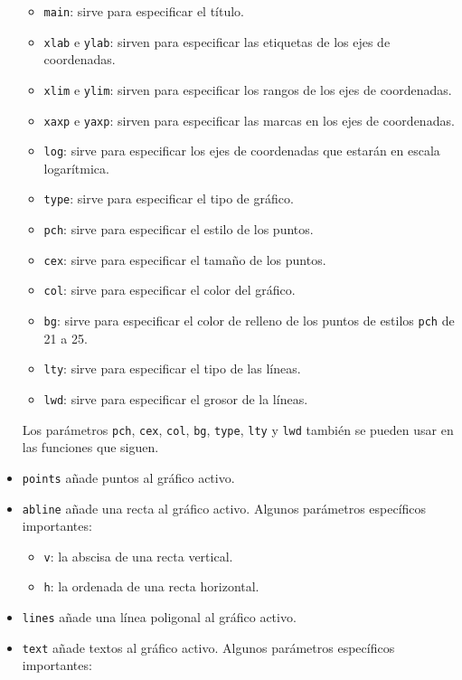 \documentclass[]{book}
\providecommand{\tightlist}{%
  \setlength{\itemsep}{0pt}\setlength{\parskip}{0pt}}
\theoremstyle{definition}
\theoremstyle{definition}
\theoremstyle{definition}
\theoremstyle{remark}
\begin{document}
\begin{itemize}
  \begin{itemize}
  \tightlist
  \item
    \texttt{main}: sirve para especificar el título.
  \item
    \texttt{xlab} e \texttt{ylab}: sirven para especificar las etiquetas de los ejes de coordenadas.
  \item
    \texttt{xlim} e \texttt{ylim}: sirven para especificar los rangos de los ejes de coordenadas.
  \item
    \texttt{xaxp} e \texttt{yaxp}: sirven para especificar las marcas en los ejes de coordenadas.
  \item
    \texttt{log}: sirve para especificar los ejes de coordenadas que estarán en escala logarítmica.
  \item
    \texttt{type}: sirve para especificar el tipo de gráfico.
  \item
    \texttt{pch}: sirve para especificar el estilo de los puntos.
  \item
    \texttt{cex}: sirve para especificar el tamaño de los puntos.
  \item
    \texttt{col}: sirve para especificar el color del gráfico.
  \item
    \texttt{bg}: sirve para especificar el color de relleno de los puntos de estilos \texttt{pch} de 21 a 25.
  \item
    \texttt{lty}: sirve para especificar el tipo de las líneas.
  \item
    \texttt{lwd}: sirve para especificar el grosor de la líneas.
  \end{itemize}

  Los parámetros \texttt{pch}, \texttt{cex}, \texttt{col}, \texttt{bg}, \texttt{type}, \texttt{lty} y \texttt{lwd} también se pueden usar en las funciones que siguen.
\item
  \texttt{points} añade puntos al gráfico activo.
\item
  \texttt{abline} añade una recta al gráfico activo. Algunos parámetros específicos importantes:

  \begin{itemize}
  \tightlist
  \item
    \texttt{v}: la abscisa de una recta vertical.
  \item
    \texttt{h}: la ordenada de una recta horizontal.
  \end{itemize}
\item
  \texttt{lines} añade una línea poligonal al gráfico activo.
\item
  \texttt{text} añade textos al gráfico activo. Algunos parámetros específicos importantes:


\end{itemize}
\end{document}
